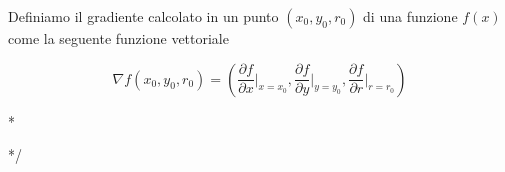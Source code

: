 \documentclass[12pt]{article}
\newenvironment{changemargin}[2]{%
    \begin{list}{}{%
    \setlength{\topsep}{0pt}%
    \setlength{\leftmargin}{#1}%
    \setlength{\rightmargin}{#2}%
    \setlength{\listparindent}{\parindent}%
    \setlength{\itemindent}{\parindent}%
    \setlength{\parsep}{\parskip}%
    }%
    \item[]}{\end{list}}
\begin{document}
        
        Definiamo il gradiente calcolato in un punto $(x_0, y_0, r_0)$ di una funzione $f(x)$ come la seguente funzione vettoriale
        
        \begin{equation}
            \nabla f (x_0, y_0, r_0) = \left( \frac{\partial f}{\partial x} \bigg\rvert_{x = x_0}, \frac{\partial f}{\partial y} \bigg\rvert_{y = y_0}, \frac{\partial f}{\partial r} \bigg\rvert_{r = r_0} \right)
        \end{equation}


\/*
    \begin{changemargin}{-1cm}{-1cm}

    
    \end{changemargin}
*/    
  
   
    \vfill
    \let\thefootnote\relax{}
\end{document}
